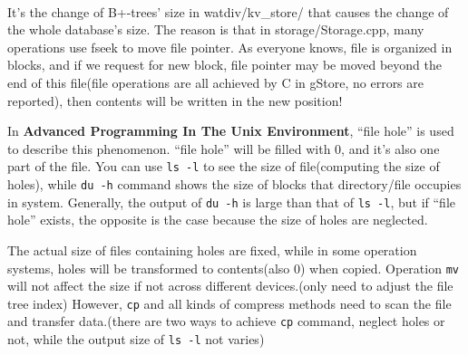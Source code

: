 \documentclass[titlepage, a4paper, 12pt]{article}
\begin{document}
\quad\\
It's the change of B+-trees' size in watdiv/kv\_store/ that causes the
change of the whole database's size. The reason is that in
storage/Storage.cpp, many operations use fseek to move file pointer. As
everyone knows, file is organized in blocks, and if we request for new
block, file pointer may be moved beyond the end of this file(file
operations are all achieved by C in gStore, no errors are reported),
then contents will be written in the new position!

In \textbf{Advanced Programming In The Unix Environment}, ``file hole''
is used to describe this phenomenon. ``file hole'' will be filled with
0, and it's also one part of the file. You can use \texttt{ls\ -l} to
see the size of file(computing the size of holes), while \texttt{du\ -h}
command shows the size of blocks that directory/file occupies in system.
Generally, the output of \texttt{du\ -h} is large than that of
\texttt{ls\ -l}, but if ``file hole'' exists, the opposite is the case
because the size of holes are neglected.

The actual size of files containing holes are fixed, while in some
operation systems, holes will be transformed to contents(also 0) when
copied. Operation \texttt{mv} will not affect the size if not across
different devices.(only need to adjust the file tree index) However,
\texttt{cp} and all kinds of compress methods need to scan the file and
transfer data.(there are two ways to achieve \texttt{cp} command,
neglect holes or not, while the output size of \texttt{ls\ -l} not
varies)
\end{document}
